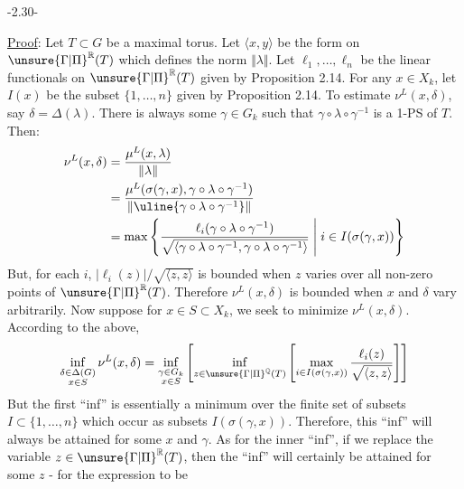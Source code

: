 \begin{center}-2.30-\end{center}
\uline{Proof}: Let $T\subset G$ be a maximal torus. Let $\langle x,y\rangle$ be the form
on $\unsure{\Gamma|\Pi}^{\mathbb R}(T)$ which defines the norm $\Vert\lambda\Vert$. Let $\ell_1,\ldots,\ell_n$ be the
linear functionals on $\unsure{\Gamma|\Pi}^{\mathbb R}(T)$ given by Proposition 2.14. For any
$x\in X_k$, let $I(x)$ be the subset $\{1,\ldots,n\}$ given by Proposition 2.14.
To estimate $\nu^L(x,\delta)$, say $\delta=\Delta(\lambda)$. There is always some $\gamma\in G_k$
such that $\gamma\circ\lambda\circ\gamma^{-1}$ is a 1-PS of $T$. Then:
\[
\begin{aligned}
\nu^L(x,\delta)&=\frac{\mu^L(x,\lambda)}{\Vert\lambda\Vert}\\
&=\frac{\mu^L(\sigma(\gamma,x),\gamma\circ\lambda\circ\gamma^{-1})}{\Vert\uline{\gamma\circ\lambda\circ\gamma^{-1}}\Vert}\\
&=\max\left\{\frac{\ell_i(\gamma\circ\lambda\circ\gamma^{-1})}{\sqrt{\langle\gamma\circ\lambda\circ\gamma^{-1},\gamma\circ\lambda\circ\gamma^{-1}\rangle}}\;\middle|\;i\in I(\sigma(\gamma,x))\right\}
\end{aligned}
\]
But, for each $i$, $|\ell_i(z)|/\sqrt{\langle z,z\rangle}$ is bounded when $z$ varies
over all non-zero points of $\unsure{\Gamma|\Pi}^{\mathbb R}(T)$. Therefore $\nu^L(x,\delta)$ is bounded
when $x$ and $\delta$ vary arbitrarily. Now suppose for $x\in S\subset X_k$, we seek
to minimize $\nu^L(x,\delta)$. According to the above,
\[
\inf_{\substack{\delta\in\Delta(G)\\x\in S}}\nu^L(x,\delta)
=\inf_{\substack{\gamma\in G_k\\x\in S}}\left[\inf_{z\in\unsure{\Gamma|\Pi}^{\mathbb Q}(T)}\left[\max_{i\in I(\sigma(\gamma,x))}\frac{\ell_i(z)}{\sqrt{\langle z,z\rangle}}\right]\right]
\]
But the first ``inf'' is essentially a minimum over the finite set of
subsets $I\subset\{1,\ldots,n\}$ which occur as subsets $I(\sigma(\gamma,x))$. Therefore,
this ``inf'' will always be attained for some $x$ and $\gamma$. As for the
inner ``inf'', if we replace the variable  $z\in\unsure{\Gamma|\Pi}^{\mathbb R}(T)$, then the ``inf''
will certainly be attained for some $z$ - for the expression to be
